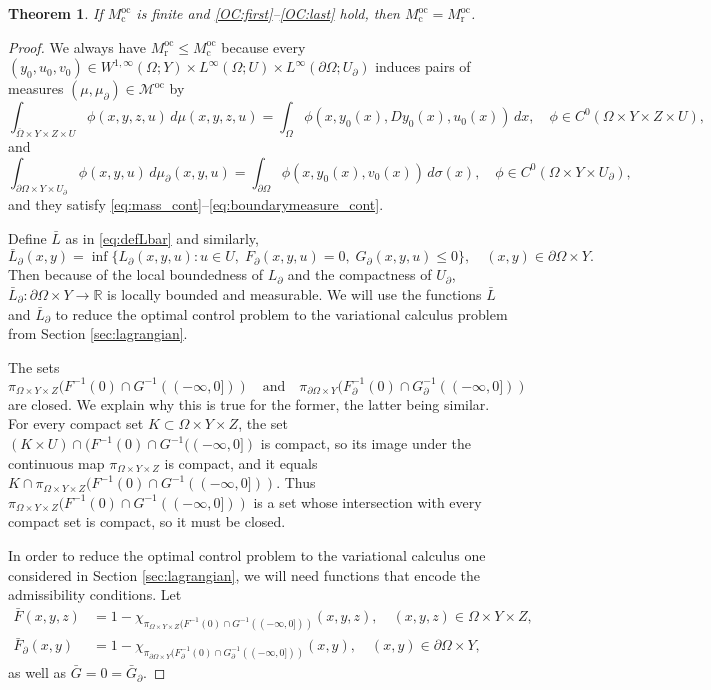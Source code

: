 \documentclass{article}
\newcommand{\R}{\mathbb{R}}
\newtheorem{theorem}{Theorem}[section]
\theoremstyle{definition}
\theoremstyle{remark}
\newcommand{\proj}{\pi}
\newcommand{\projXYZ}{\proj_{\Omega\times Y\times Z}}
\newcommand{\projdXY}{\proj_{\partial\Omega\times Y}}
\begin{document}
 
\begin{theorem}\label{cor:oc}
 If $M^\mathrm{oc}_\mathrm{c}$ is finite and \ref{OC:first}--\ref{OC:last} hold, then $M^\mathrm{oc}_\mathrm{c}=M^\mathrm{oc}_\mathrm{r}$.
\end{theorem}
\begin{proof}
 We always have $M^\mathrm{oc}_\mathrm{r}\leq M^\mathrm{oc}_\mathrm{c}$ because every  $(y_0,u_0,v_0)\in W^{1,\infty}(\Omega;Y)\times L^{\infty}(\Omega;U)\times L^\infty(\partial\Omega;U_\partial)$ induces pairs of measures $(\mu,\mu_\partial)\in \mathcal M^\mathrm{oc}$ by
\[\int_{\overline\Omega\times Y\times Z\times U}\phi(x,y,z,u)\,d\mu(x,y,z,u)=\int_{\Omega}\phi(x,y_0(x),Dy_0(x),u_0(x))\,dx,\quad \phi\in C^0(\Omega\times Y\times Z\times U),\]
and 
\[ \int_{\partial\Omega\times Y\times U_\partial}\phi(x,y,u)\,d\mu_\partial(x,y,u)=\int_{\partial\Omega}\phi(x,y_0(x),v_0(x))\,d\sigma(x),\quad \phi\in C^0(\Omega\times Y\times U_\partial),\]
and they satisfy \eqref{eq:mass_cont}--\eqref{eq:boundarymeasure_cont}.

 Define $\bar L$ as in \eqref{eq:defLbar} and similarly,
 \[\bar L_\partial(x,y)=\inf \{L_\partial(x,y,u):u\in U,\; F_\partial(x,y,u)=0,\;G_\partial(x,y,u)\leq 0\},\quad (x,y)\in \partial\Omega\times Y.\]
 Then because of the local boundedness of $L_\partial$ and the compactness of $U_\partial$, $\bar L_\partial\colon \partial\Omega\times Y\to \R$ is locally bounded and measurable. We will use the functions $\bar L$ and $\bar L_\partial $ to reduce the optimal control problem to the variational calculus problem from Section \ref{sec:lagrangian}.
 
 The sets 
 \[\projXYZ{}(F^{-1}(0)\cap G^{-1}((-\infty,0]))\quad\textrm{and} \quad\projdXY{}(F_\partial^{-1}(0)\cap G_\partial^{-1}((-\infty,0]))\]
 are closed. We explain why this is true for the former, the latter being similar. For every compact set $K\subset \Omega\times Y\times Z$, the set $(K\times U)\cap (F^{-1}(0)\cap G^{-1}((-\infty,0])$ is compact, so its image under the continuous map $\projXYZ{}$ is compact, and it equals $K\cap\projXYZ{}(F^{-1}(0)\cap G^{-1}((-\infty,0])) $. Thus $\projXYZ{}(F^{-1}(0)\cap G^{-1}((-\infty,0]))$ is a set whose intersection with every compact set is compact, so it must be closed.

In order to reduce the optimal control problem to the variational calculus one considered in Section \ref{sec:lagrangian}, we will need functions that encode the admissibility conditions. Let
\begin{align*}
 \bar F(x,y,z)&=1-\chi_{\projXYZ{}(F^{-1}(0)\cap G^{-1}((-\infty,0]))}(x,y,z),\quad (x,y,z)\in \Omega\times Y\times Z,\\
 \bar F_\partial(x,y)&=1-\chi_{\projdXY{}(F_\partial^{-1}(0)\cap G_\partial^{-1}((-\infty,0]))}(x,y),\quad (x,y)\in\partial\Omega\times Y,
 \end{align*}
 as well as $\bar G=0=\bar G_\partial$.


\end{proof}
\end{document}
